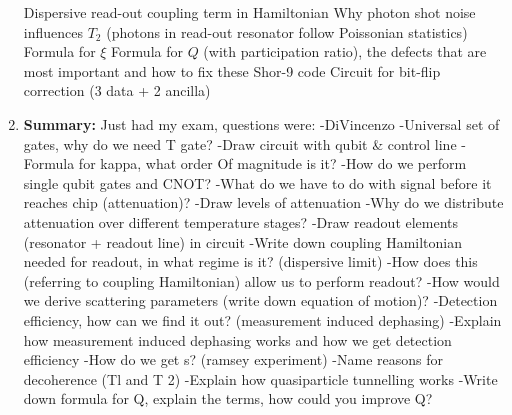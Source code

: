 \documentclass{article}%
\begin{document}
\begin{enumerate}
 Dispersive read{-}out coupling term in Hamiltonian\newline%
 Why photon shot noise influences %
$T_2$ %
 (photons in read{-}out resonator follow Poissonian statistics)\newline%
 Formula for %
$\xi$%
\newline%
 Formula for %
$Q$ %
 (with participation ratio), the defects that are most important and how to fix these\newline%
 Shor{-}9 code\newline%
 Circuit for bit{-}flip correction (3 data + 2 ancilla)%
\item%
\begin{mycolorbox}%
\textbf{Summary:}%
\newline%
Just had my exam, questions were:\newline%
 {-}DiVincenzo\newline%
 {-}Universal set of gates, why do we need T gate?\newline%
 {-}Draw circuit with qubit \& control line\newline%
 {-}Formula for kappa, what order Of magnitude is it?\newline%
 {-}How do we perform single qubit gates and CNOT?\newline%
 {-}What do we have to do with signal before it reaches chip (attenuation)?\newline%
 {-}Draw levels of attenuation\newline%
 {-}Why do we distribute attenuation over different temperature stages?\newline%
 {-}Draw readout elements (resonator + readout line) in circuit\newline%
 {-}Write down coupling Hamiltonian needed for readout, in what regime is it? (dispersive limit)\newline%
 {-}How does this (referring to coupling Hamiltonian) allow us to perform readout?\newline%
 {-}How would we derive scattering parameters (write down equation of motion)?\newline%
 {-}Detection efficiency, how can we find it out? (measurement induced dephasing)\newline%
 {-}Explain how measurement induced dephasing works and how we get detection efficiency\newline%
 {-}How do we get s? (ramsey experiment)\newline%
 {-}Name reasons for decoherence (Tl and T 2)\newline%
 {-}Explain how quasiparticle tunnelling works\newline%
 {-}Write down formula for Q, explain the terms, how could you improve Q?%
\end{mycolorbox}%
\end{enumerate}%
\end{document}
